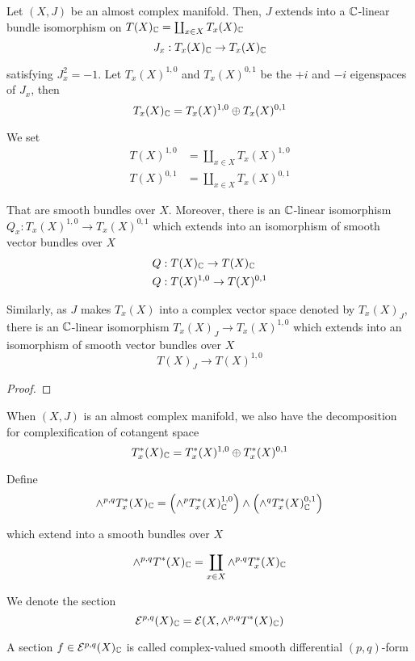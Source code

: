 \begin{definition}[bundle $T(X)^{1,0}$, $T(X)^{0,1}$]
	Let $(X, J)$ be an almost complex manifold. Then, $J$ extends into a $\C$-linear bundle isomorphism on $T(X)_\C = \coprod_{x \in X} T_x(X)_\C$
	$$
	J_x: T_x(X)_\C \to T_x(X)_\C
	$$
	
	satisfying $J_x^2 = -1$. Let $T_x(X)^{1,0}$ and $T_x(X)^{0,1}$ be the $+i$ and $-i$ eigenspaces of $J_x$, then
	$$
	T_x(X)_\C = T_x(X)^{1,0} \oplus T_x(X)^{0,1}
	$$
	
	We set
	\begin{align*}
		T(X)^{1,0} &= \coprod_{x \in X} T_x(X)^{1,0} \\
		T(X)^{0,1} &= \coprod_{x \in X} T_x(X)^{0,1}
	\end{align*}
	
	That are smooth bundles over $X$. Moreover, there is an $\C$-linear isomorphism $Q_x: T_x(X)^{1,0} \to T_x(X)^{0,1}$ which extends into an isomorphism of smooth vector bundles over $X$
	\begin{align*}
		Q&: T(X)_\C \to T(X)_\C \\
		Q&: T(X)^{1,0} \to T(X)^{0,1} \\
	\end{align*}
	
	Similarly, as $J$ makes $T_x(X)$ into a complex vector space denoted by $T_x(X)_J$, there is an $\C$-linear isomorphism $T_x(X)_J \to T_x(X)^{1,0}$ which extends into an isomorphism of smooth vector bundles over $X$
	$$
	T(X)_J \to T(X)^{1,0}
	$$
	\begin{proof}
	\end{proof}
\end{definition}

\begin{definition}
	When $(X, J)$ is an almost complex manifold, we also have the decomposition for complexification of cotangent space
	$$
		T_x^*(X)_\C = T_x^*(X)^{1,0} \oplus T_x^*(X)^{0,1}
	$$
	
	Define
	$$
		\wedge^{p,q} T_x^*(X)_\C = \tuple*{\wedge^p T_x^*(X)^{1,0}_\C} \wedge \tuple*{\wedge^q T_x^*(X)^{0,1}_\C}
	$$
	
	which extend into a smooth bundles over $X$
	
	$$
		\wedge^{p,q} T^*(X)_\C = \coprod_{x \in X} \wedge^{p,q} T_x^*(X)_\C
	$$
	
	We denote the section
	$$
	\E^{p,q}(X)_\C = \E\tuple*{X, \wedge^{p, q} T^*(X)_\C}
	$$
	
	A section $f \in \E^{p, q}(X)_\C$ is called complex-valued smooth differential $(p, q)$-form
\end{definition}


